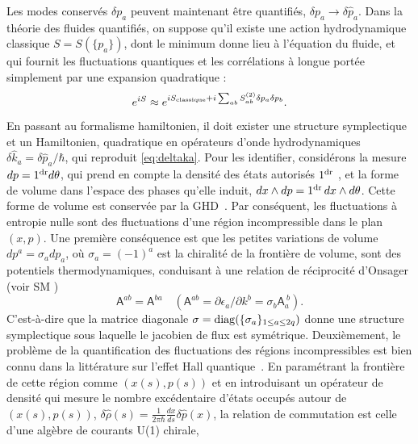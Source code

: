 \documentclass[twocolumn,amsfonts,showpacs,superscriptaddress]{revtex4-1}
\newcommand{\trad}[1]{\textcolor{myblue}{#1}}
\begin{document}
\trad{\vspace{0.1cm} \noindent {\bf\em Quantification des ondes sonores.}\; Les modes conservés $\delta p_a$ peuvent maintenant être quantifiés, $\delta p_a\rightarrow \delta\hat p_a$. Dans la théorie des fluides quantifiés, on suppose qu'il existe une action hydrodynamique classique $S = S(\{p_a\})$, dont le minimum donne lieu à l'équation du fluide, et qui fournit les fluctuations quantiques et les corrélations à longue portée simplement par une expansion quadratique :
\begin{equation*}
	e^{iS} \approx e^{iS_{\rm classique} + i\sum_{ab} S^{(2)}_{ab} \delta p_a \delta p_{b} }.
\end{equation*}
En passant au formalisme hamiltonien, il doit exister une structure symplectique et un Hamiltonien, quadratique en opérateurs d'onde hydrodynamiques $\delta \hat k_a=\delta \hat p_a/\hbar$, qui reproduit \eqref{eq:deltaka}.
Pour les identifier, considérons la mesure $d p = 1^{\rm dr} d\theta$, qui prend en compte la densité des états autorisés $1^{\rm dr}$ \cite{korepin1997quantum}, et la forme de volume dans l'espace des phases qu'elle induit, $dx \wedge dp = 1^{\rm dr}\, dx \wedge d\theta$. Cette forme de volume est conservée par la GHD~\cite{doyon2018geometric}. Par conséquent, les fluctuations à entropie nulle sont des fluctuations d'une région incompressible dans le plan $(x,p)$. Une première conséquence est que les petites variations de volume $d p^a = \sigma_a dp_a$, où $\sigma_a = (-1)^a$ est la chiralité de la frontière de volume, sont des potentiels thermodynamiques, conduisant à une relation de réciprocité d'Onsager (voir SM \cite{SM})
\begin{equation*}%
	\mathsf A^{ab} = \mathsf A^{ba} \quad
	(\mathsf A^{ab} = \partial \epsilon_a / \partial k^b
	=\sigma_b \mathsf A_a^{~b}).
\end{equation*}
C'est-à-dire que la matrice diagonale $\sigma = {\rm diag}( \{ \sigma_a \}_{1\leq a \leq 2q})$ donne une structure symplectique sous laquelle le jacobien de flux est symétrique. Deuxièmement, le problème de la quantification des fluctuations des régions incompressibles est bien connu dans la littérature sur l'effet Hall quantique~\cite{wen1990chiral,wen1992theory,iso1992fermions,cappelli1993infinite}. En paramétrant la frontière de cette région comme $(x(s), p(s))$ et en introduisant un opérateur de densité qui mesure le nombre excédentaire d'états occupés autour de $(x(s), p(s))$, $\delta \hat{\rho} (s) = \frac{1}{2\pi \hbar} \frac{dx}{ds}  \delta \hat{p} (x)$, la relation de commutation est celle d'une algèbre de courants U(1) chirale,
}
\end{document}
